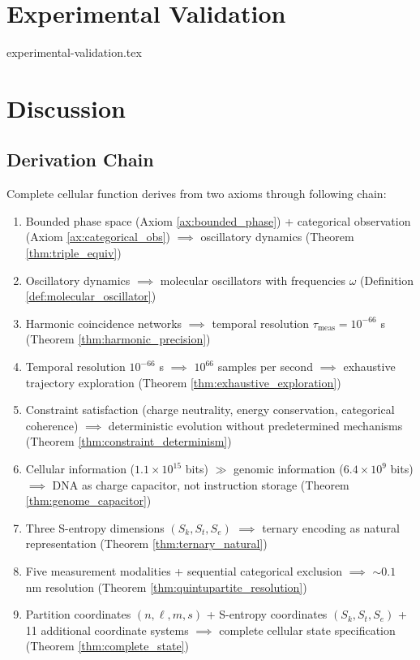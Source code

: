 \documentclass[11pt,a4paper]{article}
\theoremstyle{remark}
\newcommand{\Sk}{S_k}
\newcommand{\St}{S_t}
\newcommand{\Se}{S_e}
\begin{document}
\section{Experimental Validation}
{experimental-validation.tex}

\section{Discussion}

\subsection{Derivation Chain}

Complete cellular function derives from two axioms through following chain:

\begin{enumerate}
\item Bounded phase space (Axiom \ref{ax:bounded_phase}) + categorical observation (Axiom \ref{ax:categorical_obs}) $\implies$ oscillatory dynamics (Theorem \ref{thm:triple_equiv})

\item Oscillatory dynamics $\implies$ molecular oscillators with frequencies $\omega$ (Definition \ref{def:molecular_oscillator})

\item Harmonic coincidence networks $\implies$ temporal resolution $\tau_{\text{meas}} = 10^{-66}$ s (Theorem \ref{thm:harmonic_precision})

\item Temporal resolution $10^{-66}$ s $\implies$ $10^{66}$ samples per second $\implies$ exhaustive trajectory exploration (Theorem \ref{thm:exhaustive_exploration})

\item Constraint satisfaction (charge neutrality, energy conservation, categorical coherence) $\implies$ deterministic evolution without predetermined mechanisms (Theorem \ref{thm:constraint_determinism})

\item Cellular information ($1.1 \times 10^{15}$ bits) $\gg$ genomic information ($6.4 \times 10^9$ bits) $\implies$ DNA as charge capacitor, not instruction storage (Theorem \ref{thm:genome_capacitor})

\item Three S-entropy dimensions $(\Sk, \St, \Se)$ $\implies$ ternary encoding as natural representation (Theorem \ref{thm:ternary_natural})

\item Five measurement modalities + sequential categorical exclusion $\implies$ $\sim 0.1$ nm resolution (Theorem \ref{thm:quintupartite_resolution})

\item Partition coordinates $(n,\ell,m,s)$ + S-entropy coordinates $(\Sk,\St,\Se)$ + 11 additional coordinate systems $\implies$ complete cellular state specification (Theorem \ref{thm:complete_state})
\end{enumerate}
\end{document}
